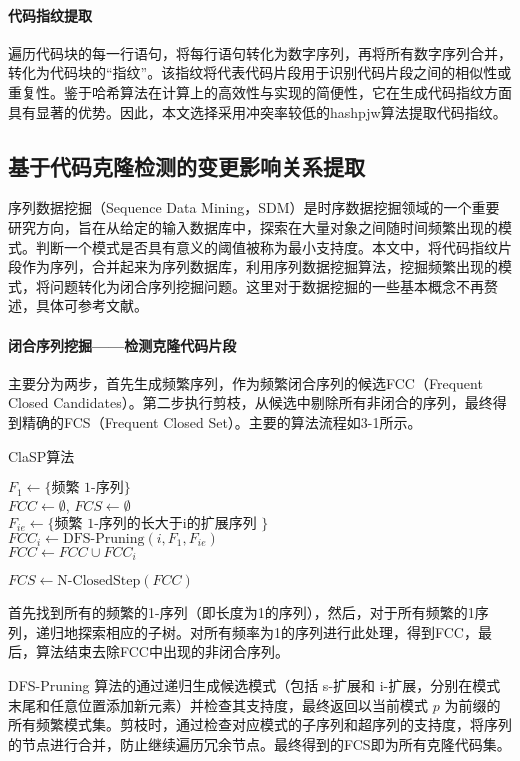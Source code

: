 \paragraph{代码指纹提取} 遍历代码块的每一行语句，将每行语句转化为数字序列，再将所有数字序列合并，转化为代码块的“指纹”。该指纹将代表代码片段用于识别代码片段之间的相似性或重复性。鉴于哈希算法在计算上的高效性与实现的简便性，它在生成代码指纹方面具有显著的优势。因此，本文选择采用冲突率较低的hashpjw算法提取代码指纹。

\subsection{基于代码克隆检测的变更影响关系提取}
序列数据挖掘（Sequence Data Mining，SDM）是时序数据挖掘领域的一个重要研究方向，旨在从给定的输入数据库中，探索在大量对象之间随时间频繁出现的模式。判断一个模式是否具有意义的阈值被称为最小支持度。本文中，将代码指纹片段作为序列，合并起来为序列数据库，利用序列数据挖掘算法，挖掘频繁出现的模式，将问题转化为闭合序列挖掘问题。这里对于数据挖掘的一些基本概念不再赘述，具体可参考文献\cite{2013ClaSP}。

\paragraph{闭合序列挖掘——检测克隆代码片段}主要分为两步，首先生成频繁序列，作为频繁闭合序列的候选FCC（Frequent Closed Candidates）。第二步执行剪枝，从候选中剔除所有非闭合的序列，最终得到精确的FCS（Frequent Closed Set）。主要的算法流程如3-1所示。

\begin{algorithm}
\caption{ClaSP算法}
 $F_1 \gets \{\text{频繁 1-序列}\}$ \\
 $FCC \gets \emptyset$, $FCS \gets \emptyset$  \\
{
    $F_{ie} \gets \{\text{频繁 1-序列的长大于i的扩展序列 } \}$ \\
    $FCC_i \gets \text{DFS-Pruning}(i, F_1, F_{ie})$ \\
    $FCC \gets FCC \cup FCC_i$
}

 $FCS \gets \text{N-ClosedStep}(FCC)$
\end{algorithm}


首先找到所有的频繁的1-序列（即长度为1的序列），然后，对于所有频繁的1序列，递归地探索相应的子树。对所有频率为1的序列进行此处理，得到FCC，最后，算法结束去除FCC中出现的非闭合序列。
    

DFS-Pruning 算法的通过递归生成候选模式（包括 s-扩展和 i-扩展，分别在模式末尾和任意位置添加新元素）并检查其支持度，最终返回以当前模式 $p$ 为前缀的所有频繁模式集。剪枝时，通过检查对应模式的子序列和超序列的支持度，将序列的节点进行合并，防止继续遍历冗余节点。最终得到的FCS即为所有克隆代码集。

